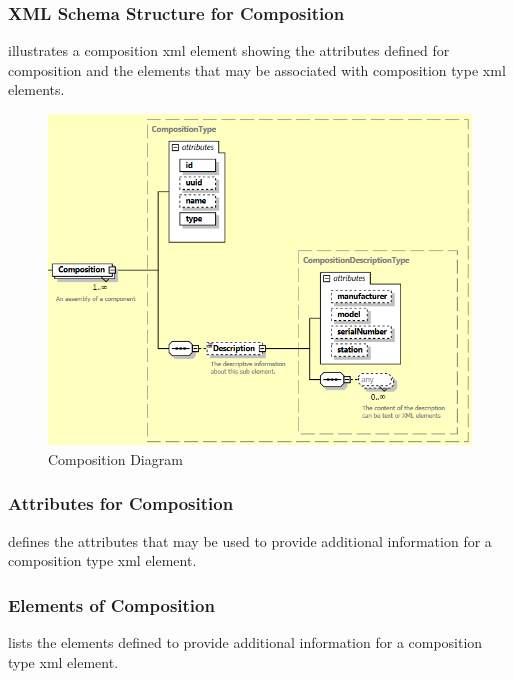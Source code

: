 

\subsubsection{XML Schema Structure for Composition}

 illustrates a \gls{composition} \gls{xml} element showing the attributes defined for \gls{composition} and the elements that may be associated with \gls{composition} type \gls{xml} elements.

\begin{figure}[ht]
  \centering
  \includegraphics[width=.75\textwidth]{figures/composition-schema-diagram.png}
  \caption{Composition Diagram}
  \label{fig:composition-schema-diagram}
\end{figure}

\FloatBarrier

\subsubsection{Attributes for Composition}

 defines the attributes that may be used to provide additional information for a \gls{composition} type \gls{xml} element.



\subsubsection{Elements of Composition}

 lists the elements defined to provide additional information for a \gls{composition} type \gls{xml} element.

